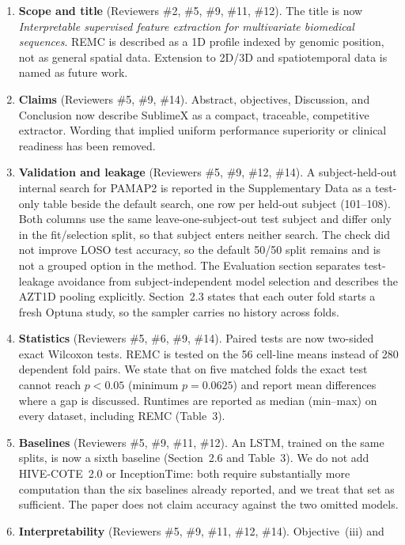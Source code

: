 \documentclass[11pt]{article}
\begin{document}
\begin{enumerate}[leftmargin=1.4em]
  \item \textbf{Scope and title} (Reviewers \#2, \#5, \#9, \#11, \#12). The title is now
    \emph{Interpretable supervised feature extraction for multivariate biomedical sequences}.
    REMC is described as a 1D profile indexed by genomic position, not as general spatial data.
    Extension to 2D/3D and spatiotemporal data is named as future work.
  \item \textbf{Claims} (Reviewers \#5, \#9, \#14). Abstract, objectives, Discussion, and
    Conclusion now describe SublimeX as a compact, traceable, competitive extractor. Wording that
    implied uniform performance superiority or clinical readiness has been removed.
  \item \textbf{Validation and leakage} (Reviewers \#5, \#9, \#12, \#14). A subject-held-out
    internal search for PAMAP2 is reported in the Supplementary Data as a test-only table beside
    the default search, one row per held-out subject (101--108). Both columns use the same
    leave-one-subject-out test subject and differ only in the fit/selection split, so that subject
    enters neither search. The check did not improve LOSO test accuracy, so the default 50/50 split
    remains and is not a grouped option in the method.
    The Evaluation section separates test-leakage avoidance from subject-independent model
    selection and describes the AZT1D pooling explicitly. Section~2.3 states that each outer fold
    starts a fresh Optuna study, so the sampler carries no history across folds.
  \item \textbf{Statistics} (Reviewers \#5, \#6, \#9, \#14). Paired tests are now two-sided exact
    Wilcoxon tests. REMC is tested on the 56 cell-line means instead of 280 dependent fold pairs.
    We state that on five matched folds the exact test cannot reach $p<0.05$ (minimum $p=0.0625$)
    and report mean differences where a gap is discussed. Runtimes are reported as
    median (min--max) on every dataset, including REMC (Table~3).
  \item \textbf{Baselines} (Reviewers \#5, \#9, \#11, \#12). An LSTM, trained on the same splits, is
    now a sixth baseline (Section~2.6 and Table~3). We do not add HIVE-COTE~2.0 or InceptionTime:
    both require substantially more computation than the six baselines already reported, and we
    treat that set as sufficient. The paper does not claim accuracy against the two omitted models.
  \item \textbf{Interpretability} (Reviewers \#5, \#9, \#11, \#12, \#14). Objective~(iii) and

\end{enumerate}
\end{document}
